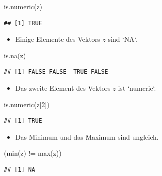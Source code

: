 \documentclass[12pt,a4paper]{article}
\newenvironment{Shaded}{\begin{snugshade}}{\end{snugshade}}
\newcommand{\DecValTok}[1]{\textcolor[rgb]{0.00,0.00,0.81}{#1}}
\newcommand{\FunctionTok}[1]{\textcolor[rgb]{0.00,0.00,0.00}{#1}}
\newcommand{\NormalTok}[1]{#1}
\newcommand{\SpecialCharTok}[1]{\textcolor[rgb]{0.00,0.00,0.00}{#1}}
\begin{document}
\begin{Shaded}
\begin{Highlighting}[]
    \FunctionTok{is.numeric}\NormalTok{(z)}
\end{Highlighting}
\end{Shaded}

\begin{verbatim}
## [1] TRUE
\end{verbatim}

\begin{itemize}
  \item Einige Elemente des Vektors $z$ sind `NA`. 
\end{itemize}

\begin{Shaded}
\begin{Highlighting}[]
    \FunctionTok{is.na}\NormalTok{(z)}
\end{Highlighting}
\end{Shaded}

\begin{verbatim}
## [1] FALSE FALSE  TRUE FALSE
\end{verbatim}

\begin{itemize}
  \item Das zweite Element des Vektors $z$ ist `numeric`.
\end{itemize}

\begin{Shaded}
\begin{Highlighting}[]
    \FunctionTok{is.numeric}\NormalTok{(z[}\DecValTok{2}\NormalTok{])}
\end{Highlighting}
\end{Shaded}

\begin{verbatim}
## [1] TRUE
\end{verbatim}

\begin{itemize}
  \item Das Minimum und das Maximum sind ungleich. 
\end{itemize}

\begin{Shaded}
\begin{Highlighting}[]
\NormalTok{    (}\FunctionTok{min}\NormalTok{(z) }\SpecialCharTok{!=} \FunctionTok{max}\NormalTok{(z))}
\end{Highlighting}
\end{Shaded}

\begin{verbatim}
## [1] NA
\end{verbatim}
\end{document}
